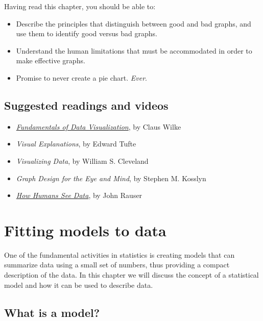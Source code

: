 \documentclass[
  12pt,
]{book}
\providecommand{\tightlist}{%
  \setlength{\itemsep}{0pt}\setlength{\parskip}{0pt}}
\begin{document}
Having read this chapter, you should be able to:

\begin{itemize}
\tightlist
\item
  Describe the principles that distinguish between good and bad graphs, and use them to identify good versus bad graphs.
\item
  Understand the human limitations that must be accommodated in order to make effective graphs.
\item
  Promise to never create a pie chart. \emph{Ever}.
\end{itemize}

\hypertarget{suggested-readings-and-videos}{%
\section{Suggested readings and videos}\label{suggested-readings-and-videos}}

\begin{itemize}
\tightlist
\item
  \href{https://serialmentor.com/dataviz/}{\emph{Fundamentals of Data Visualization}}, by Claus Wilke
\item
  \emph{Visual Explanations}, by Edward Tufte
\item
  \emph{Visualizing Data}, by William S. Cleveland
\item
  \emph{Graph Design for the Eye and Mind}, by Stephen M. Kosslyn
\item
  \href{https://www.youtube.com/watch?v=fSgEeI2Xpdc\&feature=youtu.be}{\emph{How Humans See Data}}, by John Rauser
\end{itemize}

\hypertarget{fitting-models}{%
\chapter{Fitting models to data}\label{fitting-models}}

One of the fundamental activities in statistics is creating models that can summarize data using a small set of numbers, thus providing a compact description of the data. In this chapter we will discuss the concept of a statistical model and how it can be used to describe data.

\hypertarget{what-is-a-model}{%
\section{What is a model?}\label{what-is-a-model}}
\end{document}
